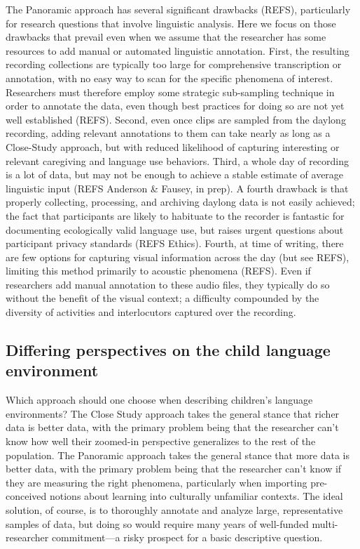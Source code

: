\documentclass[,man,floatsintext]{apa6}
\begin{document}
The Panoramic approach has several significant drawbacks (REFS),
particularly for research questions that involve linguistic analysis.
Here we focus on those drawbacks that prevail even when we assume that
the researcher has some resources to add manual or automated linguistic
annotation. First, the resulting recording collections are typically too
large for comprehensive transcription or annotation, with no easy way to
scan for the specific phenomena of interest. Researchers must therefore
employ some strategic sub-sampling technique in order to annotate the
data, even though best practices for doing so are not yet well
established (REFS). Second, even once clips are sampled from the daylong
recording, adding relevant annotations to them can take nearly as long
as a Close-Study approach, but with reduced likelihood of capturing
interesting or relevant caregiving and language use behaviors. Third, a
whole day of recording is a lot of data, but may not be enough to
achieve a stable estimate of average linguistic input (REFS Anderson \&
Fausey, in prep). A fourth drawback is that properly collecting,
processing, and archiving daylong data is not easily achieved; the fact
that participants are likely to habituate to the recorder is fantastic
for documenting ecologically valid language use, but raises urgent
questions about participant privacy standards (REFS Ethics). Fourth, at
time of writing, there are few options for capturing visual information
across the day (but see REFS), limiting this method primarily to
acoustic phenomena (REFS). Even if researchers add manual annotation to
these audio files, they typically do so without the benefit of the
visual context; a difficulty compounded by the diversity of activities
and interlocutors captured over the recording.

\subsection{Differing perspectives on the child language
environment}\label{differing-perspectives-on-the-child-language-environment}

Which approach should one choose when describing children's language
environments? The Close Study approach takes the general stance that
richer data is better data, with the primary problem being that the
researcher can't know how well their zoomed-in perspective generalizes
to the rest of the population. The Panoramic approach takes the general
stance that more data is better data, with the primary problem being
that the researcher can't know if they are measuring the right
phenomena, particularly when importing pre-conceived notions about
learning into culturally unfamiliar contexts. The ideal solution, of
course, is to thoroughly annotate and analyze large, representative
samples of data, but doing so would require many years of well-funded
multi-researcher commitment---a risky prospect for a basic descriptive
question.
\end{document}
